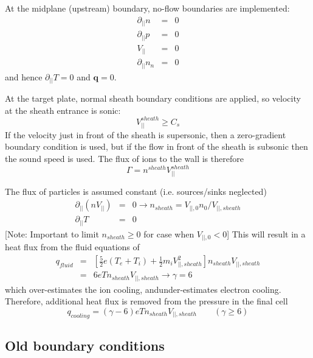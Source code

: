\documentclass[12pt,a4paper]{article}
\begin{document}
At the midplane (upstream) boundary, no-flow boundaries are implemented:
\begin{eqnarray}
  \partial_{||}n &=& 0 \\
  \partial_{||}p &=& 0 \nonumber \\
  V_{||} &=& 0 \nonumber \\
  \partial_{||}n_n &=& 0 \nonumber
\end{eqnarray}
and hence $\partial_{||}T = 0$ and $\mathbf{q} = 0$.

At the target plate, normal sheath boundary conditions are applied, so velocity at the sheath entrance
is sonic:
\begin{equation}
V_{||}^{sheath} \ge C_s
\end{equation}
If the velocity just in front of the sheath is supersonic, then a zero-gradient boundary condition is used, but if
the flow in front of the sheath is subsonic then the sound speed is used. The flux of ions to the wall is therefore 
\begin{equation}
\Gamma = n^{sheath}V_{||}^{sheath}
\end{equation}

The flux of particles is assumed constant (i.e. sources/sinks neglected)
  \begin{eqnarray*}
   \partial_{||} \left( nV_{||} \right) &=& 0 \rightarrow n_{sheath} = V_{||,0} n_0 /  V_{||,sheath} \\
   \partial_{||} T &=& 0
 \end{eqnarray*}
 [Note: Important to limit $n_{sheath} \ge 0$ for case when $V_{||,0} < 0$]
 This will result in a heat flux from the fluid equations of
  \begin{eqnarray*}
  q_{fluid} &=& \left[\frac{5}{2}e\left(T_e + T_i\right) + \frac{1}{2}m_i V_{||,sheath}^2\right]n_{sheath}V_{||,sheath} \\
  &=& 6eTn_{sheath}V_{||,sheath} \rightarrow \gamma = 6
  \end{eqnarray*}
  which over-estimates the ion cooling, andunder-estimates electron cooling.
  Therefore, additional heat flux is removed from the pressure in the final cell
  \[
  q_{cooling} = \left(\gamma - 6\right)eTn_{sheath}V_{||,sheath}  \qquad \left( \gamma \ge 6 \right)
  \]
  
\subsection{Old boundary conditions}
\end{document}
